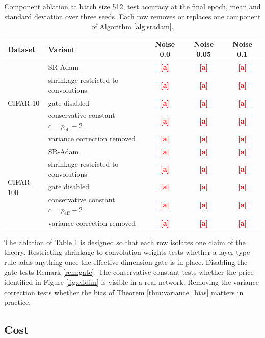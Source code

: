 \documentclass[pdflatex,sn-mathphys-num]{sn-jnl}%
\theoremstyle{thmstyleone}%
\theoremstyle{thmstyletwo}%
\theoremstyle{thmstylethree}%
\newcommand{\torerun}[1]{\textcolor{red}{\textbf{[#1]}}}
\newcommand{\peff}{p_{\mathrm{eff}}}
\begin{document}
\begin{table}[t]
\centering
\caption{Component ablation at batch size 512, test accuracy at the final epoch, mean and standard deviation over three seeds. Each row removes or replaces one component of Algorithm \ref{alg:sradam}.}
\label{tab:ablation}
\begin{tabular}{llccc}
\toprule
Dataset & Variant & Noise 0.0 & Noise 0.05 & Noise 0.1 \\
\midrule
\multirow{5}{*}{CIFAR-10}
 & SR-Adam                                & \torerun{a} & \torerun{a} & \torerun{a} \\
 & shrinkage restricted to convolutions   & \torerun{a} & \torerun{a} & \torerun{a} \\
 & gate disabled                          & \torerun{a} & \torerun{a} & \torerun{a} \\
 & conservative constant $c=\peff-2$      & \torerun{a} & \torerun{a} & \torerun{a} \\
 & variance correction removed            & \torerun{a} & \torerun{a} & \torerun{a} \\
\midrule
\multirow{5}{*}{CIFAR-100}
 & SR-Adam                                & \torerun{a} & \torerun{a} & \torerun{a} \\
 & shrinkage restricted to convolutions   & \torerun{a} & \torerun{a} & \torerun{a} \\
 & gate disabled                          & \torerun{a} & \torerun{a} & \torerun{a} \\
 & conservative constant $c=\peff-2$      & \torerun{a} & \torerun{a} & \torerun{a} \\
 & variance correction removed            & \torerun{a} & \torerun{a} & \torerun{a} \\
\bottomrule
\end{tabular}
\end{table}

The ablation of Table \ref{tab:ablation} is designed so that each row isolates one claim of the theory. Restricting shrinkage to convolution weights tests whether a layer-type rule adds anything once the effective-dimension gate is in place. Disabling the gate tests Remark \ref{rem:gate}. The conservative constant tests whether the price identified in Figure \ref{fig:effdim} is visible in a real network. Removing the variance correction tests whether the bias of Theorem \ref{thm:variance_bias} matters in practice.

\subsection{Cost}
\end{document}
